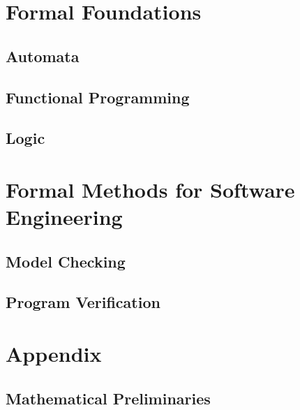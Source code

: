 \documentclass{book}
\begin{document}
\part{Formal Foundations}

  \chapter{Automata} %
  
  \chapter{Functional Programming} %
  
  \chapter{Logic} %

\part{Formal Methods for Software Engineering}

  \chapter{Model Checking} %
    

  \chapter{Program Verification} %

%
%  

\part{Appendix}

\appendix

\chapter{Mathematical Preliminaries}\label{sec:math}




\end{document}
